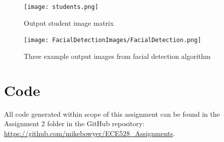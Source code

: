 \documentclass[12pt, letterpaper, final, onecolumn, titlepage] {article}
\begin{document}
\begin{figure}[htbp]
	\centerline{\texttt{[image: students.png]}}
	\caption{Output student image matrix}
	\label{studentMatrix}
\end{figure}

\begin{figure}[htbp]
	\centerline{\texttt{[image: FacialDetectionImages/FacialDetection.png]}}
	\caption{Three example output images from facial detection algorithm}
	\label{facialDetect}
\end{figure}

\pagebreak

\section{Code}

All code generated within scope of this assignment can be found in the Assignment 2 folder in the GitHub repository:
\url{https://github.com/mikebowyer/ECE528_Assignments}.
\end{document}
